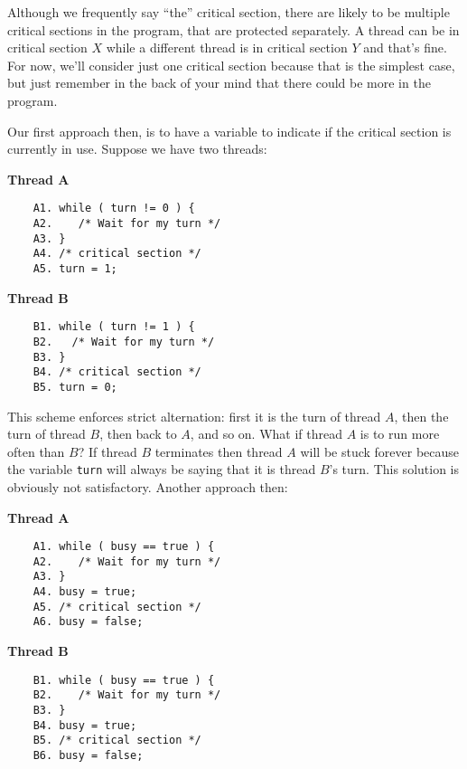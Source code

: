 Although we frequently say ``the'' critical section, there are likely to be multiple critical sections in the program, that are protected separately. A thread can be in critical section $X$ while a different thread is in critical section $Y$ and that's fine. For now, we'll consider just one critical section because that is the simplest case, but just remember in the back of your mind that there could be more in the program.

Our first approach then, is to have a variable to indicate if the critical section is currently in use. Suppose we have two threads:

\begin{multicols}{2}
	\textbf{Thread A}\vspace{-2em}
	\begin{verbatim}
	A1. while ( turn != 0 ) {
	A2.    /* Wait for my turn */
	A3. }
	A4. /* critical section */
	A5. turn = 1;
	\end{verbatim}
	\columnbreak
	\textbf{Thread B}\vspace{-2em}
	\begin{verbatim}
	B1. while ( turn != 1 ) {
	B2.   /* Wait for my turn */
	B3. }
	B4. /* critical section */
	B5. turn = 0;
	\end{verbatim}
\end{multicols}

This scheme enforces strict alternation: first it is the turn of thread $A$, then the turn of thread $B$, then back to $A$, and so on. What if thread $A$ is to run more often than $B$? If thread $B$ terminates then thread $A$ will be stuck forever because the variable \texttt{turn} will always be saying that it is thread $B$'s turn. This solution is obviously not satisfactory. Another approach then:

\begin{multicols}{2}
	\textbf{Thread A}\vspace{-2em}
	\begin{verbatim}
	A1. while ( busy == true ) {
	A2.    /* Wait for my turn */
	A3. }
	A4. busy = true;
	A5. /* critical section */
	A6. busy = false;
	\end{verbatim}
	\columnbreak
	\textbf{Thread B}\vspace{-2em}
	\begin{verbatim}
	B1. while ( busy == true ) {
	B2.    /* Wait for my turn */
	B3. }
	B4. busy = true;
	B5. /* critical section */
	B6. busy = false;
	\end{verbatim}
\end{multicols}


